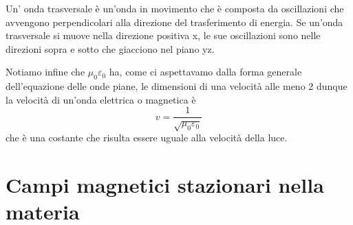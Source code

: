 \documentclass[
10pt, %
a4paper, %
oneside, %
headinclude,footinclude, %
BCOR5mm, %
]{scrartcl}
\begin{document}
\begin{definizione}
	Un' onda trasversale è un'onda in movimento che è composta da oscillazioni che avvengono perpendicolari alla direzione del trasferimento di energia. Se un'onda trasversale si muove nella direzione positiva x, le sue oscillazioni sono nelle direzioni sopra e sotto che giacciono nel piano yz.
\end{definizione}
Notiamo infine che $\mu_0\varepsilon_0$ ha, come ci aspettavamo dalla forma generale dell'equazione delle onde piane, le dimensioni di una velocità alle meno 2 dunque la velocità di un'onda elettrica o magnetica è 
\[v = \frac{1}{\sqrt{\mu_0\varepsilon_0}}\]
che è una costante che risulta essere uguale alla velocità della luce. 
\newpage
\section{Campi magnetici stazionari nella materia}
\end{document}
